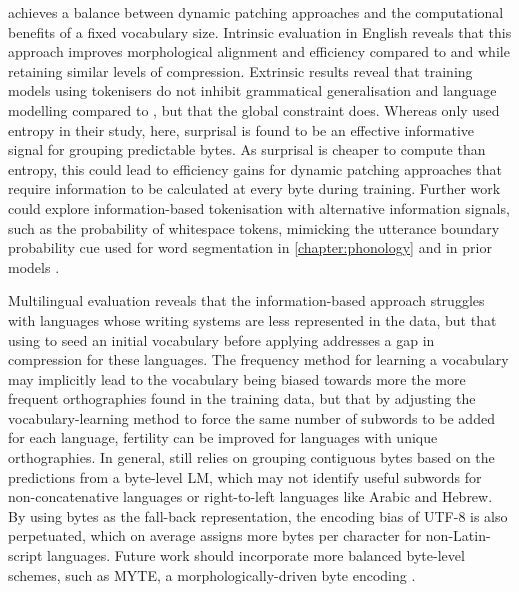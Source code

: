 \bytespan achieves a balance between dynamic patching approaches and the computational benefits of a fixed vocabulary size. Intrinsic evaluation in English reveals that this approach improves morphological alignment and \renyi efficiency compared to \bpe and \bpewp while retaining similar levels of compression. Extrinsic results reveal that training models using \bytespan tokenisers do not inhibit grammatical generalisation and language modelling compared to \bpe, but that the global constraint does. Whereas \citet{pagnoni2024byte} only used entropy in their study, here, surprisal is found to be an effective informative signal for grouping predictable bytes. As surprisal is cheaper to compute than entropy, this could lead to efficiency gains for dynamic patching approaches that require information to be calculated at every byte during training. Further work could explore information-based tokenisation with alternative information signals, such as the probability of whitespace tokens, mimicking the utterance boundary probability cue used for word segmentation in \cref{chapter:phonology} and in prior models \citep{christiansen1998learning}.

Multilingual evaluation reveals that the information-based approach struggles with languages whose writing systems are less represented in the data, but that using \bytespan to seed an initial vocabulary before applying \bpe addresses a gap in compression for these languages. The frequency method for learning a vocabulary may implicitly lead to the vocabulary being biased towards more the more frequent orthographies found in the training data, but that by adjusting the vocabulary-learning method to force the same number of subwords to be added for each language, fertility can be improved for languages with unique orthographies. In general, \bytespan still relies on grouping contiguous bytes based on the predictions from a byte-level LM, which may not identify useful subwords for non-concatenative languages or right-to-left languages like Arabic and Hebrew. By using bytes as the fall-back representation, the encoding bias of UTF-8 is also perpetuated, which on average assigns more bytes per character for non-Latin-script languages. Future work should incorporate more balanced byte-level schemes, such as MYTE, a morphologically-driven byte encoding \citep{limisiewicz-etal-2024-myte}.

